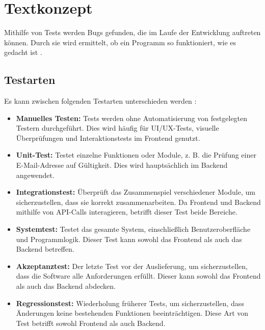 \documentclass[a4paper,12pt]{article}
\begin{document}
\newpage
\section{Textkonzept}
Mithilfe von Tests werden Bugs gefunden, die im Laufe der Entwicklung auftreten können. Durch sie wird ermittelt, ob ein Programm so funktioniert, wie es gedacht ist \cite{eichstadt_testen_2024}.

\subsection{Testarten}
Es kann zwischen folgenden Testarten unterschieden werden \cite{eichstadt_testen_2024}:
\begin{itemize}
    \item \textbf{Manuelles Testen:} Tests werden ohne Automatisierung von festgelegten Testern durchgeführt. Dies wird häufig für UI/UX-Tests, visuelle Überprüfungen und Interaktionstests im Frontend genutzt.
    \item \textbf{Unit-Test:} Testet einzelne Funktionen oder Module, z. B. die Prüfung einer E-Mail-Adresse auf Gültigkeit. Dies wird hauptsächlich im Backend angewendet.
    \item \textbf{Integrationstest:} Überprüft das Zusammenspiel verschiedener Module, um sicherzustellen, dass sie korrekt zusammenarbeiten. Da Frontend und Backend mithilfe von API-Calls interagieren, betrifft dieser Test beide Bereiche.
    \item \textbf{Systemtest:} Testet das gesamte System, einschließlich Benutzeroberfläche und Programmlogik. Dieser Test kann sowohl das Frontend als auch das Backend betreffen.
    \item \textbf{Akzeptanztest:} Der letzte Test vor der Auslieferung, um sicherzustellen, dass die Software alle Anforderungen erfüllt. Dieser kann sowohl das Frontend als auch das Backend abdecken.
    \item \textbf{Regressionstest:} Wiederholung früherer Tests, um sicherzustellen, dass Änderungen keine bestehenden Funktionen beeinträchtigen. Diese Art von Test betrifft sowohl Frontend als auch Backend.
\end{itemize}
\end{document}
